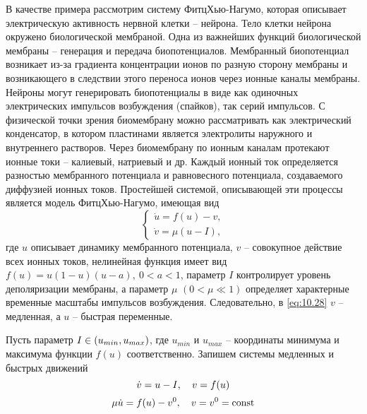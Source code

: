В качестве примера рассмотрим систему ФитцХью-Нагумо, которая
описывает электрическую активность нервной клетки – нейрона. Тело клетки
нейрона окружено биологической мембраной. Одна из важнейших функций
биологической мембраны – генерация и передача биопотенциалов.
Мембранный биопотенциал возникает из-за градиента концентрации ионов по
разную сторону мембраны и возникающего в следствии этого переноса ионов
через ионные каналы мембраны. Нейроны могут генерировать биопотенциалы
в виде как одиночных электрических импульсов возбуждения (спайков), так
серий импульсов. С физической точки зрения биомембрану можно
рассматривать как электрический конденсатор, в котором пластинами является
электролиты наружного и внутреннего растворов. Через биомембрану по
ионным каналам протекают ионные токи – калиевый, натриевый и др. Каждый
ионный ток определяется разностью мембранного потенциала и равновесного
потенциала, создаваемого диффузией ионных токов. Простейшей системой,
описывающей эти процессы является модель ФитцХью-Нагумо, имеющая вид
\begin{equation}
        \label{eq:10.30}
        \begin{cases}
                \dot u = f(u) - v,\\
                \dot v = \mu(u-I),
        \end{cases}
\end{equation}
где $u$ описывает динамику мембранного потенциала, $v$ -- совокупное действие
всех ионных токов, нелинейная функция имеет вид $f(u) = u(1-u)(u-a),~0<a<1$,
параметр $I$ контролирует уровень деполяризации мембраны, а параметр $\mu$ 
$(0<\mu \ll 1)$ определяет характерные временные масштабы импульсов возбуждения.
Следовательно, в \eqref{eq:10.28} $v$ -- медленная, а $u$ -- быстрая переменные.

Пусть параметр $I \in \qty(u_{min},u_{max})$, где $u_{min}$ и $u_{max}$ -- координаты 
минимума и максимума функции $f(u)$ соответственно. Запишем системы медленных
и быстрых движений
\begin{equation}
        \label{eq:10.31}
        \dot v = u - I, \quad v = f(u)\\
\end{equation}
\begin{equation}
        \label{eq:10.32}
        \mu \dot u = f(u) - v^0, \quad v=v^0=\textrm{const}
\end{equation}

